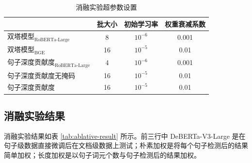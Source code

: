 \begin{table}[htbp]
\centering
\caption{消融实验超参数设置}
\label{tab:ablative-parameter}
\begin{tabular}{l|ccc}
\toprule
                      & \textbf{批大小} & \textbf{初始学习率} & \textbf{权重衰减系数} \\ \midrule
$\text{双塔模型}_\text{RoBERTa-Large}$    & 8            & $10^{-6}$      & 0.001           \\
$\text{双塔模型}_\text{BGE}$         & 16           & $10^{-5}$      & 0.01            \\
$\text{句子深度贡献度}_\text{RoBERTa-Large}$ & 4            & $10^{-6}$      & 0.001           \\
句子深度贡献度无掩码            & 16           & $10^{-5}$      & 0.01            \\
句子深度贡献度               & 16           & $10^{-5}$      & 0.01           \\ \bottomrule
\end{tabular}
\end{table}

\subsection{消融实验结果}
\label{sec:method-experiment-ablative-result}

消融实验结果如表 \ref{tab:ablative-result} 所示。前三行中 DeBERTa-V3-Large 是在句子级数据直接微调后在文档级数据上测试；朴素加权是将每个句子检测后的结果简单加权；长度加权是以句子词元个数与句子检测后的结果加权。

